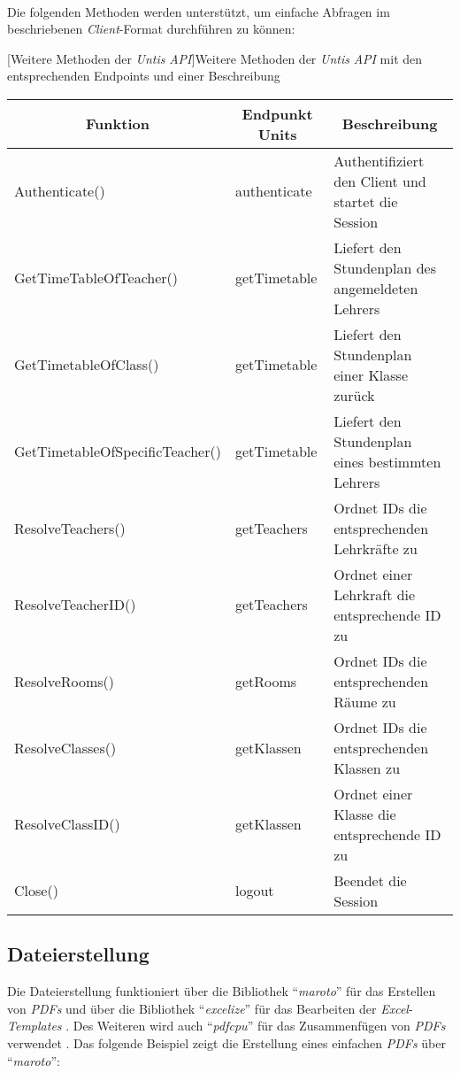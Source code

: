 ~\\Die folgenden Methoden werden unterstützt, um einfache Abfragen im beschriebenen \textit{Client}-Format durchführen zu können:

\newpage

[Weitere Methoden der \textit{Untis} \textit{API}]{Weitere Methoden der \textit{Untis} \textit{API} mit den entsprechenden Endpoints und einer Beschreibung \cite{untis}}
\begin{table}
	\begin{tabular}{|l|l|l|}
		\hline
		\multicolumn{1}{|c|}{\textbf{Funktion}} & \multicolumn{1}{c|}{\textbf{Endpunkt Units}} & \multicolumn{1}{c|}{\textbf{Beschreibung}} \\ \hline
		Authenticate() & authenticate & Authentifiziert den Client und startet die Session \\ \hline
		GetTimeTableOfTeacher() & getTimetable & Liefert den Stundenplan des angemeldeten Lehrers \\ \hline
		GetTimetableOfClass() & getTimetable & Liefert den Stundenplan einer Klasse zurück \\ \hline
		GetTimetableOfSpecificTeacher() & getTimetable & Liefert den Stundenplan eines bestimmten Lehrers \\ \hline
		ResolveTeachers() & getTeachers & Ordnet IDs die entsprechenden Lehrkräfte zu \\ \hline
		ResolveTeacherID() & getTeachers & Ordnet einer Lehrkraft die entsprechende ID zu \\ \hline
		ResolveRooms() & getRooms & Ordnet IDs die entsprechenden Räume zu \\ \hline
		ResolveClasses() & getKlassen & Ordnet IDs die entsprechenden Klassen zu \\ \hline
		ResolveClassID() & getKlassen & Ordnet einer Klasse die entsprechende ID zu \\ \hline
		Close() & logout & Beendet die Session \\ \hline
	\end{tabular}
\end{table}
\newpage
\subsection{Dateierstellung}


Die Dateierstellung funktioniert über die Bibliothek \enquote{\textit{maroto}} für das Erstellen von \textit{PDFs} und über die Bibliothek \enquote{\textit{excelize}} für das Bearbeiten der \textit{Excel}-\textit{Templates} \cite{marotoart} \cite{maroto} \cite{excelize}. Des Weiteren wird auch \enquote{\textit{pdfcpu}} für das Zusammenfügen von \textit{PDFs} verwendet \cite{pdfcpu}. Das folgende Beispiel zeigt die Erstellung eines einfachen \textit{PDFs} über \enquote{\textit{maroto}}:

